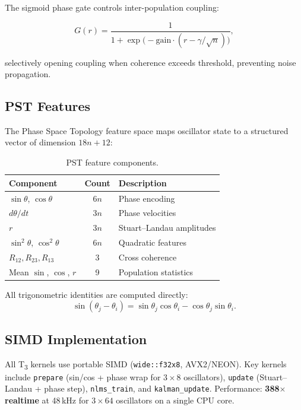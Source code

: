 \documentclass[twocolumn,10pt]{article}
\newcommand{\Tthree}{T\textsubscript{3}}
\begin{document}
The sigmoid phase gate controls inter-population coupling:

\begin{equation}
G(r) = \frac{1}{1 + \exp\bigl(-\text{gain}\cdot(r - \gamma/\sqrt{n})\bigr)},
\end{equation}

selectively opening coupling when coherence exceeds threshold, preventing noise propagation.

\subsection{PST Features}

The Phase Space Topology feature space maps oscillator state to a structured vector of dimension $18n+12$:

\begin{table}[h]
\centering
\caption{PST feature components.}
\begin{tabular}{lcl}
\toprule
Component & Count & Description \\
\midrule
$\sin\theta$, $\cos\theta$ & $6n$ & Phase encoding \\
$d\theta/dt$ & $3n$ & Phase velocities \\
$r$ & $3n$ & Stuart--Landau amplitudes \\
$\sin^2\theta$, $\cos^2\theta$ & $6n$ & Quadratic features \\
$R_{12},R_{23},R_{13}$ & 3 & Cross coherence \\
Mean $\sin$, $\cos$, $r$ & 9 & Population statistics \\
\bottomrule
\end{tabular}
\end{table}

All trigonometric identities are computed directly:
\begin{equation}
\sin(\theta_j-\theta_i) = \sin\theta_j\cos\theta_i - \cos\theta_j\sin\theta_i.
\end{equation}

\subsection{SIMD Implementation}

All \Tthree{} kernels use portable SIMD (\texttt{wide::f32x8}, AVX2/NEON). Key kernels include \texttt{prepare} (sin/cos + phase wrap for $3\times8$ oscillators), \texttt{update} (Stuart--Landau + phase step), \texttt{nlms\_train}, and \texttt{kalman\_update}. Performance: \textbf{388$\times$ realtime} at 48\,kHz for $3\times64$ oscillators on a single CPU core.
\end{document}
